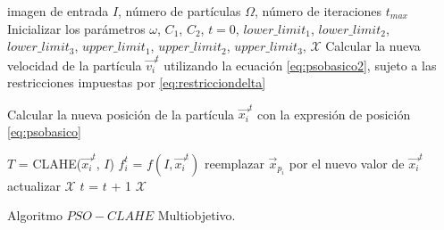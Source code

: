 \documentclass[spanish,twocolumn]{article}
\begin{document}
\begin{algorithm}[H]
    \scriptsize
    \begin{algorithmic}[1]
        \Require imagen de entrada $I$, número de partículas $\Omega$, número de iteraciones $t_{max}$
        \State Inicializar los parámetros $\omega$, $C_1$, $C_2$, $t=0$, $lower\_limit_1$, $lower\_limit_2$, $lower\_limit_3$, $upper\_limit_1$, $upper\_limit_2$, $upper\_limit_3$, $\mathscr{X}$
                \State Calcular la nueva velocidad de la partícula $\overrightarrow{v_i}^t$ utilizando la ecuación \eqref{eq:psobasico2}, sujeto a las restricciones impuestas por \eqref{eq:restricciondelta}




                \State Calcular la nueva posición de la partícula $\overrightarrow{x_i}^t$ con la expresión de posición \eqref{eq:psobasico}

                \State ${T}$ = CLAHE(${\overrightarrow{x_i}^t}$, ${I}$)
                \State ${f^t_i}$ = $f(I, \overrightarrow{x_i}^t)$%
                    \State reemplazar $\overrightarrow{x}_{p_i}$ por el nuevo valor de $\overrightarrow{x_i}^t$
                \EndIf
                    \State actualizar $\mathscr{X}$
                \EndIf
                \State $t$ = $t$ + 1
            \EndFor
        \EndWhile
    \Ensure $\mathscr{X}$
    \end{algorithmic}
    \caption{Algoritmo $PSO-CLAHE$ Multiobjetivo.}
    \label{alg:pso_clahe}
\end{algorithm}
\end{document}
